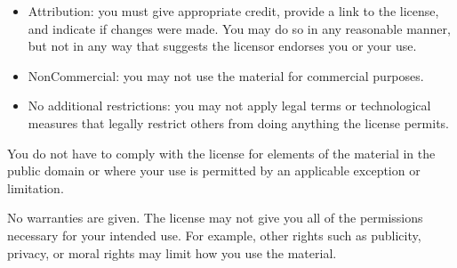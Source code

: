 {  \begin{itemize}
  \item Attribution: you must give appropriate credit, provide a link
  to the license, and indicate if changes were made. You may do so in
  any reasonable manner, but not in any way that suggests the licensor
  endorses you or your use.
  \item NonCommercial: you may not use the material for commercial
  purposes.
  \item No additional restrictions: you may not apply legal terms or
  technological measures that legally restrict others from doing
  anything the license permits.
  \end{itemize}

  You do not have to comply with the license for elements of the
  material in the public domain or where your use is permitted by an
  applicable exception or limitation.

  No warranties are given. The license may not give you all of the
  permissions necessary for your intended use. For example, other
  rights such as publicity, privacy, or moral rights may limit how you
  use the material.

 \clearpage

 \thispagestyle{plain}
 \par
}
\makeatother
